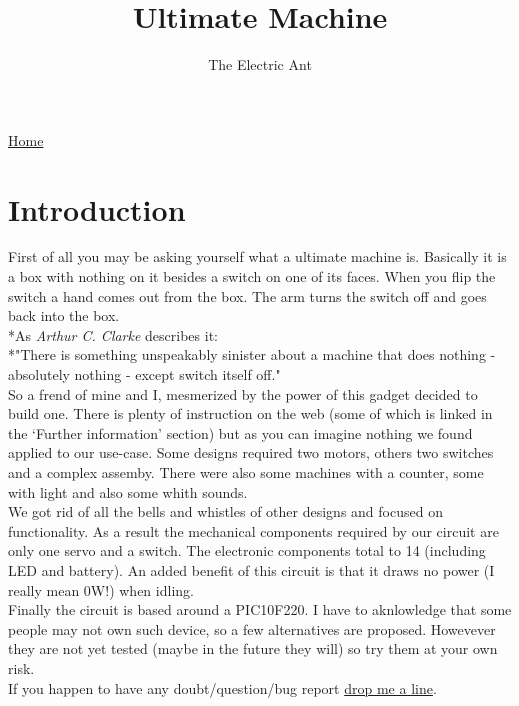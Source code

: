 \documentclass{article}
\title{Ultimate Machine}
\date {}
\author{The Electric Ant}
\def\wl{\par \noindent \vspace{\lineskip}}
\begin{document}
\maketitle
\href{index.html}{Home}
\wl
\tableofcontents
%
%
\section{Introduction}
First of all you may be asking yourself what a ultimate machine is.
Basically it is a box with nothing on it besides a switch on one of its faces.
When you flip the switch a hand comes out from the box. The arm turns the switch off and goes back into the box.
\\*As \emph{Arthur C. Clarke} describes it:
\\*"There is something unspeakably sinister about a machine that does nothing - absolutely nothing - except switch itself off."
\\ So a frend of mine and I, mesmerized by the power of this gadget decided to build one.
There is plenty of instruction on the web (some of which is linked in the `Further information' section) but as you can imagine nothing we found applied to our use-case.
Some designs required two motors, others two switches and a complex assemby.
There were also some machines with a counter, some with light and also some whith sounds.
\\We got rid of all the bells and whistles of other designs and focused on functionality.
As a result the mechanical components required by our circuit are only one servo and a switch. The electronic components total to 14 (including LED and battery).
An added benefit of this circuit is that it draws no power (I really mean 0W!) when idling.
\\ Finally the circuit is based around a PIC10F220.
I have to aknlowledge that some people may not own such device, so a few alternatives are proposed. Howevever they are not yet tested (maybe  in the future they will) so try them at your own risk.
\\ If you happen to have any doubt/question/bug report \href{mailto:electricant@anche.no}{drop me a line}.
%
%
\end{document}
